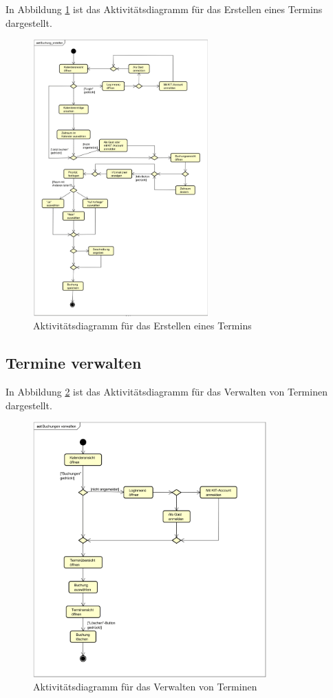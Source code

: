 In Abbildung \ref{fig:activity_diagram_booking} ist das Aktivitätsdiagramm für das Erstellen eines Termins dargestellt.
\begin{figure}[ht]
    \centering
    \includegraphics[width=0.6\textwidth]{figures/activitydiagrams/buchungerstellen}
    \caption{Aktivitätsdiagramm für das Erstellen eines Termins}
    \label{fig:activity_diagram_booking}
\end{figure}


\clearpage
\subsection{Termine verwalten}
In Abbildung \ref{fig:activity_diagram_booking_manage} ist das Aktivitätsdiagramm für das Verwalten von Terminen dargestellt.
\begin{figure}[ht]
    \centering
    \includegraphics[width=0.8\textwidth]{figures/activitydiagrams/buchungverwalten}
    \caption{Aktivitätsdiagramm für das Verwalten von Terminen}
    \label{fig:activity_diagram_booking_manage}
\end{figure}

